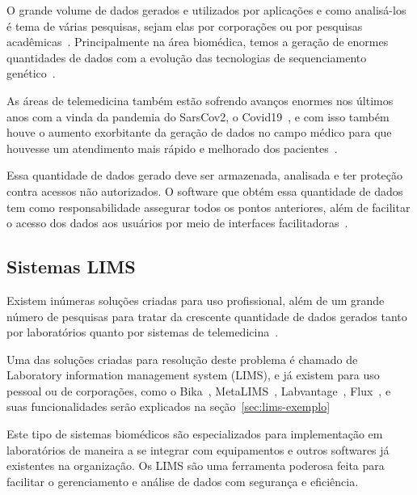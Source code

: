 
O grande volume de dados gerados e utilizados por aplicações e como analisá-los é tema de várias pesquisas, sejam elas por corporações ou por pesquisas acadêmicas~\cite{PhilipChen2014Data-intensiveData}. Principalmente na área biomédica, temos a geração de enormes quantidades de dados com a evolução das tecnologias de sequenciamento genético~\cite{luoJ2016}.

As áreas de telemedicina também estão sofrendo avanços enormes nos últimos anos com a vinda da pandemia do SarsCov2, o Covid19~\cite{bakhtiar2020, kronenfeld2021, GatesB.Colbert2020UtilityEra}, e com isso também houve o aumento exorbitante da geração de dados no campo médico para que houvesse um atendimento mais rápido e melhorado dos pacientes~\cite{MohdKhanapiAbdGhani2018PDFData, Coakley2015TransformingAnalytics}.

Essa quantidade de dados gerado deve ser armazenada, analisada e ter proteção contra acessos não autorizados. O software que obtém essa quantidade de dados tem como responsabilidade assegurar todos os pontos anteriores, além de facilitar o acesso dos dados aos usuários por meio de interfaces facilitadoras~\cite{Nolan1998UnderstandingSystems}.

\subsection{Sistemas LIMS}

Existem inúmeras soluções criadas para uso profissional, além de um grande número de pesquisas para tratar da crescente quantidade de dados gerados tanto por laboratórios quanto por sistemas de telemedicina~\cite{Mangrulkar2022AutomaticTechniques}.

Uma das soluções criadas para resolução deste problema é chamado de Laboratory information management system (LIMS), e já existem para uso pessoal ou de corporações, como o Bika~\cite{Goodblatt2006FosteringProcess}, MetaLIMS~\cite{Heinle2017MetaLIMSLabs}, Labvantage~\cite{Smallmon2017BiobankingSilos}, Flux~\cite{Melo2010SIGLa:Laboratories}, e suas funcionalidades serão explicados na seção~\ref{sec:lims-exemplo}

Este tipo de sistemas biomédicos são especializados para implementação em laboratórios de maneira a se integrar com equipamentos e outros softwares já existentes na organização.
Os LIMS são uma ferramenta poderosa feita para facilitar o gerenciamento e análise de dados com segurança e eficiência.



